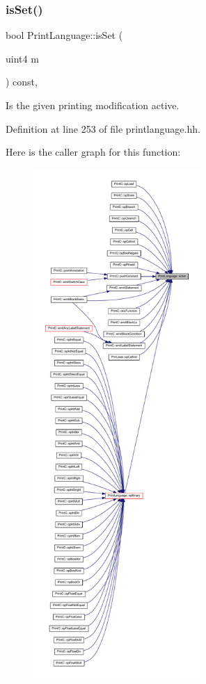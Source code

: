 \subsubsection{\texorpdfstring{isSet()}{isSet()}}
{\footnotesize\ttfamily bool Print\+Language\+::is\+Set (\begin{DoxyParamCaption}\item[{uint4}]{m }\end{DoxyParamCaption}) const\hspace{0.3cm}{\ttfamily [inline]}, {\ttfamily [protected]}}



Is the given printing modification active. 



Definition at line 253 of file printlanguage.\+hh.

Here is the caller graph for this function\+:
\nopagebreak
\begin{figure}[H]
\begin{center}
\leavevmode
\includegraphics[height=550pt]{class_print_language_a5341048f4596e03bd186dd1468183220_icgraph}
\end{center}
\end{figure}
\mbox{\label{class_print_language_ae49714ea4a8560619b0a71850c2ca3c1}} 
